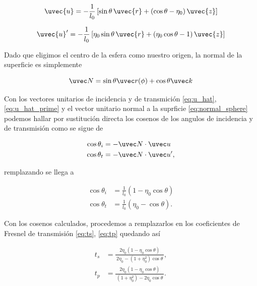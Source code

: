 \begin{equation}
\uvec{u} = -\frac{1}{l_0}\left[\sin\theta\,\uvec{r} +
(\cos\theta - \eta_0)\,\uvec{z}\right]
\end{equation}

\begin{equation}
  \uvec{u}' = -\frac{1}{l_0}\left[\eta_0\sin\theta\,\uvec{r} +
(\eta_0\cos\theta - 1)\,\uvec{z}\right]
\end{equation}



Dado que eligimos el centro de la esfera como nuestro origen, la normal de la superficie es simplemente 

\begin{equation}
    \uvec N = \sin \theta \uvec r(\phi) + \cos \theta \uvec k 
    \label{eq:normal_sphere}
\end{equation}

Con los vectores unitarios de incidencia y de transmición \ref{eq:u_hat}, \ref{eq:u_hat_prime} y el vector unitario normal a la suprficie \ref{eq:normal_sphere} podemos hallar por sustitución directa los cosenos de los angulos de incidencia y de transmisión como se sigue de 

\begin{align}
    \cos\theta_i &= -\uvec N \cdot \uvec u \\
    \cos\theta_t &= -\uvec N \cdot \uvec u',
    \label{eq:cos_i_cos_t}
\end{align}

remplazando se llega a 

\begin{align}
    \cos\theta_i &= \frac{1}{l_0}(1-\eta_0\cos\theta) \\
    \cos\theta_t &= \frac{1}{l_0}(\eta_0 - \cos\theta).
    \label{eq:cos_i_cos_t_theta}
\end{align}

Con los cosenos calculados, procedemos a remplazarlos en los coeficientes de Fresnel de transmisión \ref{eq:ts}, \ref{eq:tp} quedando así 


\begin{equation}
\begin{aligned}
    t_s &= \frac{2\eta_0\left(1 - \eta_0 \cos\theta\right)}
                 {\,2\eta_0 - (1 + \eta_0^2)\cos\theta\,}, \\[6pt]
    t_p &= \frac{2\eta_0\left(1 - \eta_0 \cos\theta\right)}
                 {\, (1 + \eta_0^2) - 2\eta_0\cos\theta\,}.
\end{aligned}
\label{eq:dioptrique_spherical_fresnel_coeffs}
\end{equation}


